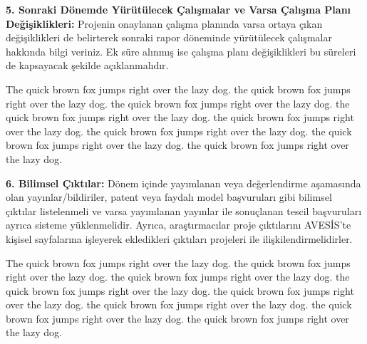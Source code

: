 \documentclass[10pt]{article}
\begin{document}
\bigskip

\bigskip

\noindent\textbf{5. Sonraki Dönemde Yürütülecek Çalışmalar ve Varsa Çalışma Planı Değişiklikleri:} Projenin onaylanan çalışma planında varsa ortaya çıkan değişiklikleri de belirterek sonraki rapor döneminde yürütülecek çalışmalar hakkında bilgi veriniz. Ek süre alınmış ise çalışma planı değişiklikleri bu süreleri de kapsayacak şekilde açıklanmalıdır.

\bigskip

\begin{framed}
        The quick brown fox jumps right over the lazy dog. the quick brown fox jumps right over the lazy dog. the quick brown fox jumps right over the lazy dog. the quick brown fox jumps right over the lazy dog. the quick brown fox jumps right over the lazy dog. the quick brown fox jumps right over the lazy dog. the quick brown fox jumps right over the lazy dog. the quick brown fox jumps right over the lazy dog.
\end{framed}

\bigskip

\bigskip

\noindent\textbf{6. Bilimsel Çıktılar:} Dönem içinde yayımlanan veya değerlendirme aşamasında olan yayınlar/bildiriler, patent veya faydalı model başvuruları gibi bilimsel çıktılar listelenmeli ve varsa yayımlanan yayınlar ile sonuçlanan tescil başvuruları ayrıca sisteme yüklenmelidir. Ayrıca, araştırmacılar proje çıktılarını AVESİS’te kişisel sayfalarına işleyerek ekledikleri çıktıları projeleri ile ilişkilendirmelidirler.

\bigskip

\begin{framed}
        The quick brown fox jumps right over the lazy dog. the quick brown fox jumps right over the lazy dog. the quick brown fox jumps right over the lazy dog. the quick brown fox jumps right over the lazy dog. the quick brown fox jumps right over the lazy dog. the quick brown fox jumps right over the lazy dog. the quick brown fox jumps right over the lazy dog. the quick brown fox jumps right over the lazy dog.
\end{framed}
\end{document}
